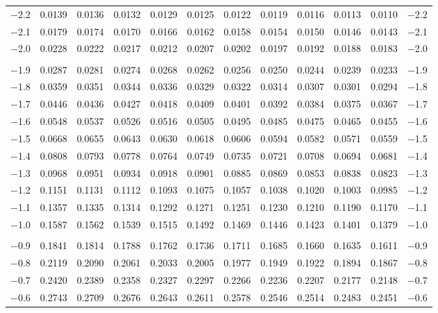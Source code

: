 \documentclass[12pt]{article}
\begin{document}
\begin{landscape}
\begin{adjustbox}{angle=270}
\begin{tabular}{
	r
	@{\hspace{4.5mm}}
	*{5}{c @{\hspace{2.5mm}}} 
	@{\hspace{-0.5mm}}
	*{5}{@{\hspace{2.5mm}} c} 
	@{\hspace{2mm}}
	r
	}
$-$2.2 & 0.0139 & 0.0136 & 0.0132 & 0.0129 & 0.0125 & 0.0122 & 0.0119 & 0.0116 & 0.0113 & 0.0110 & $-$2.2 \\
$-$2.1 & 0.0179 & 0.0174 & 0.0170 & 0.0166 & 0.0162 & 0.0158 & 0.0154 & 0.0150 & 0.0146 & 0.0143 & $-$2.1 \\
$-$2.0 & 0.0228 & 0.0222 & 0.0217 & 0.0212 & 0.0207 & 0.0202 & 0.0197 & 0.0192 & 0.0188 & 0.0183 & $-$2.0 \\
&&&&&&&&&&{} \\
$-$1.9 & 0.0287 & 0.0281 & 0.0274 & 0.0268 & 0.0262 & 0.0256 & 0.0250 & 0.0244 & 0.0239 & 0.0233 & $-$1.9 \\
$-$1.8 & 0.0359 & 0.0351 & 0.0344 & 0.0336 & 0.0329 & 0.0322 & 0.0314 & 0.0307 & 0.0301 & 0.0294 & $-$1.8 \\
$-$1.7 & 0.0446 & 0.0436 & 0.0427 & 0.0418 & 0.0409 & 0.0401 & 0.0392 & 0.0384 & 0.0375 & 0.0367 & $-$1.7 \\
$-$1.6 & 0.0548 & 0.0537 & 0.0526 & 0.0516 & 0.0505 & 0.0495 & 0.0485 & 0.0475 & 0.0465 & 0.0455 & $-$1.6 \\
$-$1.5 & 0.0668 & 0.0655 & 0.0643 & 0.0630 & 0.0618 & 0.0606 & 0.0594 & 0.0582 & 0.0571 & 0.0559 & $-$1.5 \\
$-$1.4 & 0.0808 & 0.0793 & 0.0778 & 0.0764 & 0.0749 & 0.0735 & 0.0721 & 0.0708 & 0.0694 & 0.0681 & $-$1.4 \\
$-$1.3 & 0.0968 & 0.0951 & 0.0934 & 0.0918 & 0.0901 & 0.0885 & 0.0869 & 0.0853 & 0.0838 & 0.0823 & $-$1.3 \\
$-$1.2 & 0.1151 & 0.1131 & 0.1112 & 0.1093 & 0.1075 & 0.1057 & 0.1038 & 0.1020 & 0.1003 & 0.0985 & $-$1.2 \\
$-$1.1 & 0.1357 & 0.1335 & 0.1314 & 0.1292 & 0.1271 & 0.1251 & 0.1230 & 0.1210 & 0.1190 & 0.1170 & $-$1.1 \\
$-$1.0 & 0.1587 & 0.1562 & 0.1539 & 0.1515 & 0.1492 & 0.1469 & 0.1446 & 0.1423 & 0.1401 & 0.1379 & $-$1.0 \\
&&&&&&&&&&{} \\
$-$0.9 & 0.1841 & 0.1814 & 0.1788 & 0.1762 & 0.1736 & 0.1711 & 0.1685 & 0.1660 & 0.1635 & 0.1611 & $-$0.9 \\
$-$0.8 & 0.2119 & 0.2090 & 0.2061 & 0.2033 & 0.2005 & 0.1977 & 0.1949 & 0.1922 & 0.1894 & 0.1867 & $-$0.8 \\
$-$0.7 & 0.2420 & 0.2389 & 0.2358 & 0.2327 & 0.2297 & 0.2266 & 0.2236 & 0.2207 & 0.2177 & 0.2148 & $-$0.7 \\
$-$0.6 & 0.2743 & 0.2709 & 0.2676 & 0.2643 & 0.2611 & 0.2578 & 0.2546 & 0.2514 & 0.2483 & 0.2451 & $-$0.6 \\

\end{tabular}
\end{adjustbox}
\end{landscape}
\end{document}
